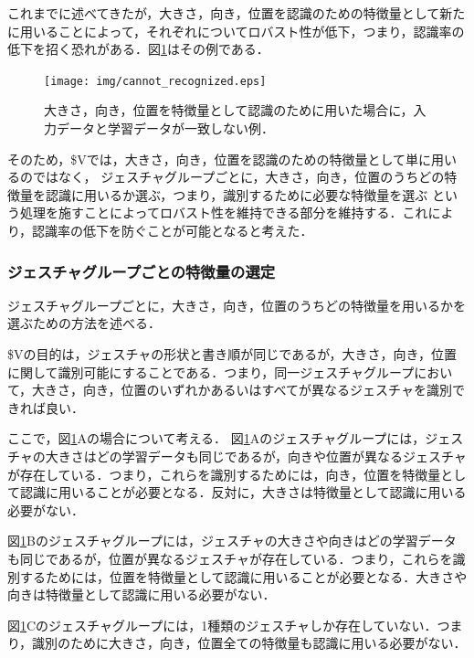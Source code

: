 これまでに述べてきたが，大きさ，向き，位置を認識のための特徴量として新たに用いることによって，それぞれについてロバスト性が低下，つまり，認識率の低下を招く恐れがある．図\ref{fig:cannot_recognized}はその例である．

\begin{figure} [h!]
	\begin{center}
		\texttt{[image: img/cannot\_recognized.eps]}
	\end{center}
	\caption{大きさ，向き，位置を特徴量として認識のために用いた場合に，入力データと学習データが一致しない例．}
	\label{fig:cannot_recognized}
\end{figure}

そのため，\$Vでは，大きさ，向き，位置を認識のための特徴量として単に用いるのではなく，
ジェスチャグループごとに，大きさ，向き，位置のうちどの特徴量を認識に用いるか選ぶ，つまり，識別するために必要な特徴量を選ぶ
という処理を施すことによってロバスト性を維持できる部分を維持する．これにより，認識率の低下を防ぐことが可能となると考えた．

\subsubsection{ジェスチャグループごとの特徴量の選定}
ジェスチャグループごとに，大きさ，向き，位置のうちどの特徴量を用いるかを選ぶための方法を述べる．

\$Vの目的は，ジェスチャの形状と書き順が同じであるが，大きさ，向き，位置に関して識別可能にすることである．つまり，同一ジェスチャグループにおいて，大きさ，向き，位置のいずれかあるいはすべてが異なるジェスチャを識別できれば良い．

ここで，図\ref{fig:cannot_recognized}Aの場合について考える．
図\ref{fig:cannot_recognized}Aのジェスチャグループには，ジェスチャの大きさはどの学習データも同じであるが，向きや位置が異なるジェスチャが存在している．つまり，これらを識別するためには，向き，位置を特徴量として認識に用いることが必要となる．反対に，大きさは特徴量として認識に用いる必要がない．

図\ref{fig:cannot_recognized}Bのジェスチャグループには，ジェスチャの大きさや向きはどの学習データも同じであるが，位置が異なるジェスチャが存在している．つまり，これらを識別するためには，位置を特徴量として認識に用いることが必要となる．大きさや向きは特徴量として認識に用いる必要がない．

図\ref{fig:cannot_recognized}Cのジェスチャグループには，1種類のジェスチャしか存在していない．つまり，識別のために大きさ，向き，位置全ての特徴量も認識に用いる必要がない．

